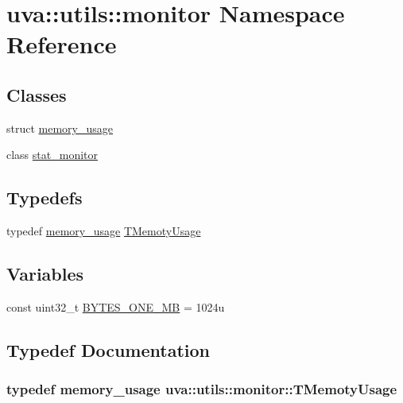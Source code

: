 \hypertarget{namespaceuva_1_1utils_1_1monitor}{}\section{uva\+:\+:utils\+:\+:monitor Namespace Reference}
\label{namespaceuva_1_1utils_1_1monitor}
\subsection*{Classes}
\begin{DoxyCompactItemize}
\item 
struct \hyperlink{structuva_1_1utils_1_1monitor_1_1memory__usage}{memory\+\_\+usage}
\item 
class \hyperlink{classuva_1_1utils_1_1monitor_1_1stat__monitor}{stat\+\_\+monitor}
\end{DoxyCompactItemize}
\subsection*{Typedefs}
\begin{DoxyCompactItemize}
\item 
typedef \hyperlink{structuva_1_1utils_1_1monitor_1_1memory__usage}{memory\+\_\+usage} \hyperlink{namespaceuva_1_1utils_1_1monitor_a49c196b840bf3fd2dc8cab233952922a}{T\+Memoty\+Usage}
\end{DoxyCompactItemize}
\subsection*{Variables}
\begin{DoxyCompactItemize}
\item 
const uint32\+\_\+t \hyperlink{namespaceuva_1_1utils_1_1monitor_aae853f690eea0d25fcf5e288859a3c75}{B\+Y\+T\+E\+S\+\_\+\+O\+N\+E\+\_\+\+M\+B} = 1024u
\end{DoxyCompactItemize}


\subsection{Typedef Documentation}
\hypertarget{namespaceuva_1_1utils_1_1monitor_a49c196b840bf3fd2dc8cab233952922a}{}
\subsubsection[{T\+Memoty\+Usage}]{\setlength{\rightskip}{0pt plus 5cm}typedef {\bf memory\+\_\+usage} {\bf uva\+::utils\+::monitor\+::\+T\+Memoty\+Usage}}\label{namespaceuva_1_1utils_1_1monitor_a49c196b840bf3fd2dc8cab233952922a}


